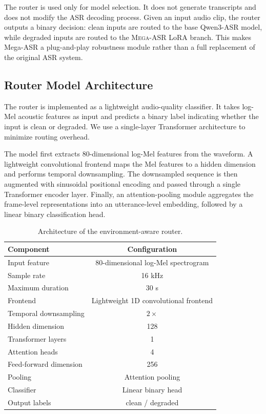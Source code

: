 \documentclass{llmxive}
\begin{document}
The router is used only for model selection. It does not generate transcripts
and does not modify the ASR decoding process. Given an input audio clip, the
router outputs a binary decision: clean inputs are routed to the base Qwen3-ASR
model, while degraded inputs are routed to the \textsc{Mega-ASR} LoRA branch. This makes
Mega-ASR a plug-and-play robustness module rather than a full replacement of the
original ASR system.



\subsection{Router Model Architecture}

The router is implemented as a lightweight audio-quality classifier. It takes
log-Mel acoustic features as input and predicts a binary label indicating
whether the input is clean or degraded. We use a single-layer Transformer
architecture to minimize routing overhead.

The model first extracts 80-dimensional log-Mel features from the waveform. A
lightweight convolutional frontend maps the Mel features to a hidden dimension
and performs temporal downsampling. The downsampled sequence is then augmented
with sinusoidal positional encoding and passed through a single Transformer
encoder layer. Finally, an attention-pooling module aggregates the frame-level
representations into an utterance-level embedding, followed by a linear binary
classification head.

\begin{table}[t]
\centering
\small
\begin{tabular}{lc}
\toprule
\textbf{Component} & \textbf{Configuration} \\
\midrule
Input feature & 80-dimensional log-Mel spectrogram \\
Sample rate & 16 kHz \\
Maximum duration & 30 s \\
Frontend & Lightweight 1D convolutional frontend \\
Temporal downsampling & $2\times$ \\
Hidden dimension & 128 \\
Transformer layers & 1 \\
Attention heads & 4 \\
Feed-forward dimension & 256 \\
Pooling & Attention pooling \\
Classifier & Linear binary head \\
Output labels & clean / degraded \\
\bottomrule
\end{tabular}
\caption{Architecture of the environment-aware router.}
\label{tab:router_architecture}
\end{table}
\end{document}
